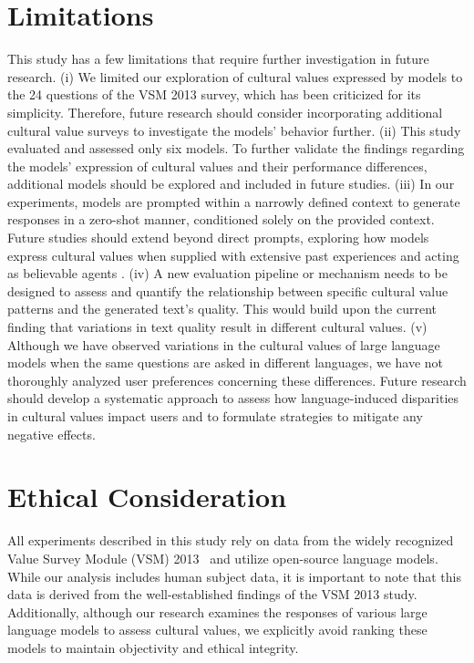 \documentclass[11pt]{article}
\begin{document}
\section{Limitations}
This study has a few limitations that require further investigation in future research.
(i) We limited our exploration of cultural values expressed by models to the 24 questions of the VSM 2013 survey, which has been criticized for its simplicity. Therefore, future research should consider incorporating additional cultural value surveys to investigate the models' behavior further.
(ii) This study evaluated and assessed only six models. To further validate the findings regarding the models' expression of cultural values and their performance differences, additional models should be explored and included in future studies.
(iii) In our experiments, models are prompted within a narrowly defined context to generate responses in a zero-shot manner, conditioned solely on the provided context. Future studies should extend beyond direct prompts, exploring how models express cultural values when supplied with extensive past experiences and acting as believable agents \cite{park2023generative}.
(iv) A new evaluation pipeline or mechanism needs to be designed to assess and quantify the relationship between specific cultural value patterns and the generated text's quality. This would build upon the current finding that variations in text quality result in different cultural values.
(v) Although we have observed variations in the cultural values of large language models when the same questions are asked in different languages, we have not thoroughly analyzed user preferences concerning these differences. Future research should develop a systematic approach to assess how language-induced disparities in cultural values impact users and to formulate strategies to mitigate any negative effects.

\section{Ethical Consideration}
All experiments described in this study rely on data from the widely recognized Value Survey Module (VSM) 2013~\cite{vsm2013-jj} and utilize open-source language models. While our analysis includes human subject data, it is important to note that this data is derived from the well-established findings of the VSM 2013 study. Additionally, although our research examines the responses of various large language models to assess cultural values, we explicitly avoid ranking these models to maintain objectivity and ethical integrity.
\end{document}

